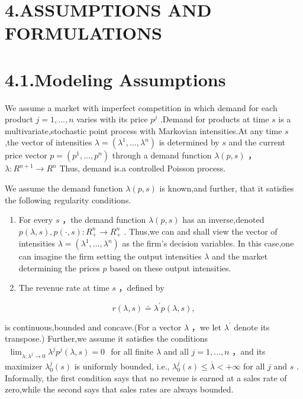 \section{4.ASSUMPTIONS AND
FORMULATIONS}\label{assumptions-and-formulations}

\section{4.1.Modeling Assumptions}\label{modeling-assumptions}

We assume a market with imperfect competition in which demand for each
product \(j = 1 , \ldots , n\) varies with its price \(p ^ { j }\)
.Demand for products at time \(s\) is a multivariate,stochastic point
process with Markovian intensities.At any time \(s\) ,the vector of
intensities \(\lambda = ( \lambda ^ { 1 } , \dots , \lambda ^ { n } )\)
is determined by \(s\) and the current price vector
\(p = ( p ^ { 1 } , \ldots , p ^ { n } )\) through a demand function
\(\lambda ( p , s )\) ， \(\lambda \colon R ^ { n + 1 } \to R ^ { n }\)
Thus, demand is.a controlled Poisson process.

We assume the demand function \(\lambda ( p , s )\) is known,and
further, that it satisfies the following regularity conditions.

\begin{enumerate}
\def\labelenumi{\arabic{enumi}.}
\item
  For every \(s\) ，the demand function \(\lambda ( p , s )\) has an
  inverse,denoted
  \(p ( \lambda , s ) , p ( \cdot , s ) \colon R _ { + } ^ { n } \to R _ { + } ^ { n }\)
  . Thus,we can and shall view the vector of intensities
  \(\lambda = ( \lambda ^ { 1 } , \ldots , \lambda ^ { n } )\) as the
  firm's decision variables. In this case,one can imagine the firm
  setting the output intensities \(\lambda\) and the market determining
  the prices \(p\) based on these output intensities.
\item
  The revenue rate at time \(s\) ，defined by
\end{enumerate}

\[
r ( \lambda , s ) \doteq \lambda ^ { \prime } p ( \lambda , s ) ,
\]

is continuous,bounded and concave.(For a vector \(\lambda\) ，we let
\(\lambda ^ { \prime }\) denote its transpose.) Further,we assume it
satisfies the conditions
\(\begin{array} { r } { \operatorname* { l i m } _ { \lambda : \lambda ^ { j } \to 0 } \lambda ^ { j } p ^ { j } ( \lambda , s ) = 0 } \end{array}\)
for all finite \(\lambda\) and all \(j = 1 , \dotsc , n\) ，and its
maximizer \(\lambda _ { 0 } ^ { j } ( s )\) is uniformly bounded, i.e.,
\(\lambda _ { 0 } ^ { j } ( s ) \leqslant \overline { { \lambda } } < + \infty\)
for all \(j\) and \(s\) . Informally, the first condition says that no
revenue is earned at a sales rate of zero,while the second says that
sales rates are always bounded.

